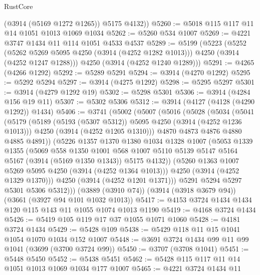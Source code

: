 \begin{lexlean}{RustCore}
\begin{coremodule}
        (@3914 (@5169 @1272 @1265))
        @5175
        @4132))
@5260 := @5018 @115 @117 @11 @14 @1051 @1013 @1069 @1034
@5262 := @5260 @534 @1007
@5269 := @4221 @3747 @1434 @11 @114 @1051 @4533 @4537
@5289 := @5199
    (@5223
      (@5252
        (@5262 @5269 @5095 @4250 (@3914 (@4252 @1282 @1013)))
        @4250
        (@3914 (@4252 @1247 @1288)))
      @4250
      (@3914 (@4252 @1240 @1289)))
@5291 := @4265 (@4266 @1292)
@5292 := @5289 @5291
@5294 := @3914 (@4270 @1292)
@5295 := @5292 @5294
@5297 := @3914 (@4275 @1292)
@5298 := @5295 @5297
@5301 := @3914 (@4279 @1292 @19)
@5302 := @5298 @5301
@5306 := @3914 (@4284 @156 @19 @11)
@5307 := @5302 @5306
@5312 := @3914 (@4127 (@4128 (@4290 @1292)) @1434)
@5406 := @3741
    (@5002
      (@5007
        (@5016
          (@5028
            (@5034
              (@5041
                (@5179
                  (@5189 (@5193 (@5307 @5312)) @5095 @4250 (@3914 (@4252 @1236 @1013)))
                  @4250
                  (@3914 (@4252 @1205 @1310)))
                @4870
                @4873
                @4876
                @4880
                @4885
                @4891))
            (@5226
              @1357
              @1370
              @1380
              @1034
              @1328
              @1007
              (@5053
                @1339
                @1355
                (@5069
                  @558
                  @1350
                  @1001
                  @568
                  @1007
                  @5110
                  @5139
                  @5147
                  @5164
                  @5167
                  (@3914 (@5169 @1350 @1343))
                  @5175
                  @4132))
              (@5260 @1363 @1007 @5269 @5095 @4250 (@3914 (@4252 @1364 @1013)))
              @4250
              (@3914 (@4252 @1329 @1370)))
            @4250
            (@3914 (@4252 @1201 @1371)))
          @5291
          @5294
          @5297
          @5301
          @5306
          @5312)))
    (@3889 (@3910 @74))
    (@3914 (@3918 @3679 @94))
    (@3661 (@3927 @94 @101 @1032 @1013))
@5417 := @4153 @3724 @1434 @1434 @120 @115 @143 @11 @1055 @1074 @1013 @1190
@5419 := @4168 @3724 @1434
@5426 := @5419 @105 @119 @17 @37 @1055 @1071 @1060
@5428 := @4181 @3724 @1434
@5429 := @5428 @109
@5438 := @5429 @118 @11 @15 @1041 @1054 @1070 @1034 @152 @1007
@5448 := @3691 @3724 @1434 @99 @11 @99 @1041 (@3699 (@3700 @3724 @99))
@5450 := @3707 (@3708 @1041)
@5451 := @5448 @5450
@5452 := @5438 @5451
@5462 := @5428 @115 @117 @11 @14 @1051 @1013 @1069 @1034 @177 @1007
@5465 := @4221 @3724 @1434 @11

\end{coremodule}
\end{lexlean}
